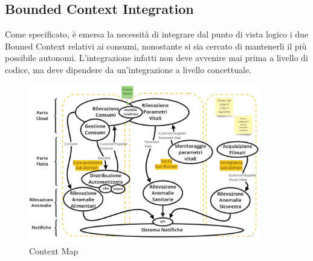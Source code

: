     \subsection{Bounded Context Integration}
    Come specificato, è emersa la necessità di integrare dal punto di vista logico i due Bouned Context relativi ai consumi, nonostante si sia cercato di mantenerli il più possibile autonomi. L'integrazione infatti non deve avvenire mai prima a livello di codice, ma deve dipendere da un'integrazione a livello concettuale. 

    \begin{figure}[ht]
        \caption{Context Map}
        \label{fig:ContextMap}
        \centering
        \includegraphics[width=0.9\textwidth]{Miro/ContextMap.jpg}
    \end{figure}
    